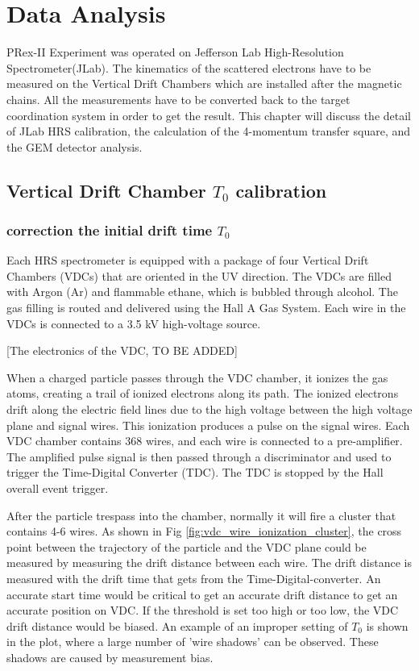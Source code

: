 \chapter{Data Analysis}

PRex-II Experiment was operated on Jefferson Lab High-Resolution Spectrometer(JLab). The kinematics of the scattered electrons have to be measured on the Vertical Drift Chambers which are installed after the magnetic chains. All the measurements have to be converted back to the target coordination system in order to get the result. This chapter will discuss the detail of JLab HRS calibration, the calculation of the 4-momentum transfer square, and the GEM detector analysis. 

\section{Vertical Drift Chamber $T_0$ calibration}

\subsection{correction the initial drift time $T_0$}

Each HRS spectrometer is equipped with a package of four Vertical Drift Chambers (VDCs) that are oriented in the UV direction. The VDCs are filled with Argon (Ar) and flammable ethane, which is bubbled through alcohol. The gas filling is routed and delivered using the Hall A Gas System. Each wire in the VDCs is connected to a 3.5 kV high-voltage source.

[The electronics of the VDC, TO BE ADDED]

When a charged particle passes through the VDC chamber, it ionizes the gas atoms, creating a trail of ionized electrons along its path. The ionized electrons drift along the electric field lines due to the high voltage between the high voltage plane and signal wires. This ionization produces a pulse on the signal wires. Each VDC chamber contains 368 wires, and each wire is connected to a pre-amplifier. The amplified pulse signal is then passed through a discriminator and used to trigger the Time-Digital Converter (TDC). The TDC is stopped by the Hall overall event trigger.

After the particle trespass into the chamber, normally it will fire a cluster that contains 4-6 wires. As shown in Fig \ref{fig:vdc_wire_ionization_cluster}, the cross point between the trajectory of the particle and the VDC plane could be measured by measuring the drift distance between each wire. The drift distance is measured with the drift time that gets from the Time-Digital-converter. An accurate start time would be critical to get an accurate drift distance to get an accurate position on VDC.  If the threshold is set too high or too low, the VDC drift distance would be biased. An example of an improper setting of $T_0$ is shown in the plot, where a large number of 'wire shadows' can be observed. These shadows are caused by measurement bias.

